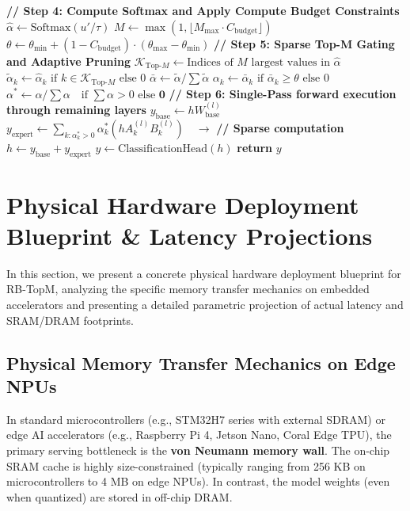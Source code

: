 \documentclass{article}
\theoremstyle{plain}
\theoremstyle{definition}
\theoremstyle{remark}
\begin{document}
\begin{algorithm}[tb]
\begin{algorithmic}[1]
\STATE \textbf{// Step 4: Compute Softmax and Apply Compute Budget Constraints}
\STATE $\hat{\alpha} \gets \text{Softmax}(u' / \tau)$
\STATE $M \gets \max(1, \lfloor M_{\max} \cdot C_{\text{budget}} \rfloor)$
\STATE $\theta \gets \theta_{\min} + (1 - C_{\text{budget}}) \cdot (\theta_{\max} - \theta_{\min})$
\vspace{0.05in}
\STATE \textbf{// Step 5: Sparse Top-M Gating and Adaptive Pruning}
\STATE $\mathcal{K}_{\text{Top-}M} \gets \text{Indices of } M \text{ largest values in } \hat{\alpha}$
\STATE $\tilde{\alpha}_k \gets \hat{\alpha}_k \text{ if } k \in \mathcal{K}_{\text{Top-}M} \text{ else } 0$
\STATE $\bar{\alpha} \gets \tilde{\alpha} / \sum \tilde{\alpha}$
\STATE $\alpha_k \gets \bar{\alpha}_k \text{ if } \bar{\alpha}_k \ge \theta \text{ else } 0$
\STATE $\alpha^* \gets \alpha / \sum \alpha \quad \text{if } \sum \alpha > 0 \text{ else } \mathbf{0}$
\vspace{0.05in}
\STATE \textbf{// Step 6: Single-Pass forward execution through remaining layers}
    \STATE $y_{\text{base}} \gets h W_{\text{base}}^{(l)}$
    \STATE $y_{\text{expert}} \gets \sum_{k: \alpha^*_k > 0} \alpha^*_k \left( h A_k^{(l)} B_k^{(l)} \right) \quad \to$ \textbf{// Sparse computation}
    \STATE $h \gets y_{\text{base}} + y_{\text{expert}}$
\ENDFOR
\STATE $y \gets \text{ClassificationHead}(h)$
\STATE \textbf{return} $y$
\end{algorithmic}
\end{algorithm}

\section{Physical Hardware Deployment Blueprint \& Latency Projections}
\label{app:hardware_deployment}

In this section, we present a concrete physical hardware deployment blueprint for RB-TopM, analyzing the specific memory transfer mechanics on embedded accelerators and presenting a detailed parametric projection of actual latency and SRAM/DRAM footprints.

\subsection{Physical Memory Transfer Mechanics on Edge NPUs}
In standard microcontrollers (e.g., STM32H7 series with external SDRAM) or edge AI accelerators (e.g., Raspberry Pi 4, Jetson Nano, Coral Edge TPU), the primary serving bottleneck is the \textbf{von Neumann memory wall}. The on-chip SRAM cache is highly size-constrained (typically ranging from 256 KB on microcontrollers to 4 MB on edge NPUs). In contrast, the model weights (even when quantized) are stored in off-chip DRAM.
\end{document}
